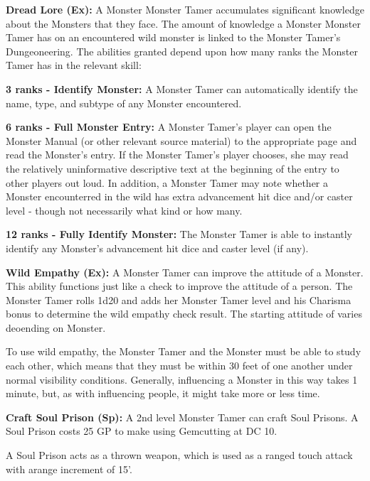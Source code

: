 \textbf{Dread Lore (Ex):} A Monster Monster Tamer accumulates significant knowledge about the Monsters that they face. The amount of knowledge a Monster Monster Tamer has on an encountered wild monster is linked to the Monster Tamer's  Dungeoneering. The abilities granted depend upon how many ranks the Monster Tamer has in the relevant skill:

\begin{itemize*}
\item \textbf{3 ranks - Identify Monster:} A Monster Tamer can automatically identify the name, type, and subtype of any Monster encountered.
\item \textbf{6 ranks - Full Monster Entry:} A Monster Tamer's player can open the Monster Manual (or other relevant source material) to the appropriate page and read the Monster's entry. If the Monster Tamer's player chooses, she may read the relatively uninformative descriptive text at the beginning of the entry to other players out loud. In addition, a Monster Tamer may note whether a Monster encounterred in the wild has extra advancement hit dice and/or caster level - though not necessarily what kind or how many.
\item \textbf{12 ranks - Fully Identify Monster:} The Monster Tamer is able to instantly identify any Monster's advancement hit dice and caster level (if any).
\end{itemize*}

\textbf{Wild Empathy (Ex):} A  Monster Tamer can improve the attitude of a Monster. This ability functions just like a  check to improve the attitude of a person. The Monster Tamer rolls 1d20 and adds her Monster Tamer level and his Charisma bonus to determine the wild empathy check result. The starting attitude of varies deoending on Monster.

To use wild empathy, the Monster Tamer and the Monster must be able to study each other, which means that they must be within 30 feet of one another under normal visibility conditions. Generally, influencing a Monster in this way takes 1 minute, but, as with influencing people, it might take more or less time.

\textbf{Craft Soul Prison (Sp):} A 2nd level Monster Tamer can craft Soul Prisons. A Soul Prison costs 25 GP to make using  Gemcutting at DC 10.

A Soul Prison acts as a thrown weapon, which is used as a ranged touch attack with arange increment of 15'.

